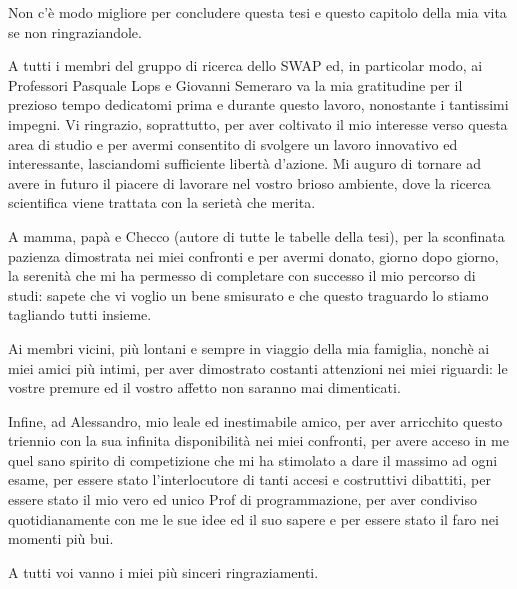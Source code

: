 Non c'è modo migliore per concludere questa tesi e questo capitolo della mia vita se non ringraziandole.

A tutti i membri del gruppo di ricerca dello SWAP ed, in particolar modo, ai Professori Pasquale Lops e Giovanni Semeraro va la mia gratitudine per il prezioso tempo 
dedicatomi prima e durante questo lavoro, nonostante i tantissimi impegni. 
Vi ringrazio, soprattutto, per aver coltivato il mio interesse verso questa area di studio e per avermi consentito di svolgere un lavoro innovativo ed interessante, 
lasciandomi sufficiente libertà d'azione.
Mi auguro di tornare ad avere in futuro il piacere di lavorare nel vostro brioso ambiente, dove la ricerca scientifica viene trattata con la serietà che merita.

A mamma, papà e Checco (autore di tutte le tabelle della tesi), per la sconfinata pazienza dimostrata nei miei confronti e per avermi donato, giorno dopo giorno, la serenità 
che mi ha permesso di completare con successo il mio percorso di studi: sapete che vi voglio un bene smisurato e che questo traguardo lo stiamo tagliando tutti insieme.

Ai membri vicini, più lontani e sempre in viaggio della mia famiglia, nonchè ai miei amici più intimi, per aver dimostrato costanti attenzioni nei miei riguardi: 
le vostre premure ed il vostro affetto non saranno mai dimenticati.

Infine, ad Alessandro, mio leale ed inestimabile amico, per aver arricchito questo triennio con la sua infinita disponibilità nei miei confronti, per avere acceso in me quel sano 
spirito di competizione che mi ha stimolato a dare il massimo ad ogni esame, per essere stato l'interlocutore di tanti accesi e costruttivi dibattiti, per essere stato il mio vero ed
unico Prof di programmazione, per aver condiviso quotidianamente con me le sue idee ed il suo sapere e per essere stato il faro nei momenti più bui.

A tutti voi vanno i miei più sinceri ringraziamenti. 

